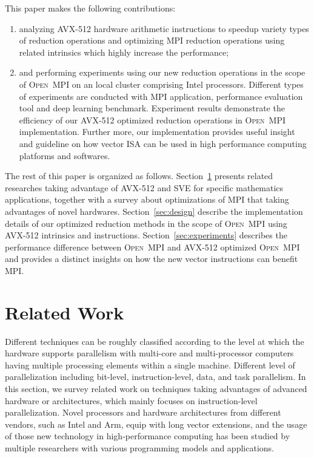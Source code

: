 \documentclass[sigconf,review]{acmart}
\newcommand{\ompi}[0]{\textsc{Open~MPI}\xspace}
\newcommand{\mpi}[0]{\textsc{MPI}\xspace}
\newcommand{\sve}[0]{\textsc{SVE}\xspace}
\begin{document}
This paper makes the following contributions:
\begin{enumerate}
  \item analyzing AVX-512 hardware arithmetic instructions to speedup variety types of reduction operations and optimizing \mpi  reduction operations using related intrinsics which highly increase the performance;
  \item and performing experiments using our
      new reduction operations in the scope of \ompi on an local cluster comprising Intel processors.
      Different types of experiments are conducted with \mpi application, performance evaluation tool and
      deep learning benchmark.
      Experiment results demonstrate the efficiency
      of our AVX-512 optimized reduction operations in \ompi implementation.
      Further more, our implementation provides useful insight and guideline on how vector
      ISA can be used in high performance computing platforms and softwares.
\end{enumerate}

The rest of this paper is organized as follows.
Section~\ref{sec:related} presents related researches taking advantage of AVX-512 and \sve for specific mathematics applications, together with a survey about optimizations of \mpi that taking advantages of novel hardwares.
Section~\ref{sec:design} describe the implementation details of our optimized reduction methods in the scope of \ompi using AVX-512 intrinsics and instructions.
Section~\ref{sec:experiments} describes the performance difference between \ompi and AVX-512 optimized \ompi and provides a distinct insights on how the new vector instructions can benefit \mpi.

\section{Related Work}\label{sec:related}
Different techniques can be roughly classified according to the level at which
the hardware supports parallelism with multi-core and multi-processor computers having
multiple processing elements within a single machine. Different level of parallelization including bit-level,
instruction-level, data, and task parallelism.
%
In this section, we survey related work on techniques taking advantages of
advanced hardware or architectures, which mainly focuses on instruction-level parallelization.
Novel processors and hardware architectures from different vendors, such as Intel and Arm,
equip with long vector extensions, and the usage of those new technology in high-performance computing has been
studied by multiple researchers with various programming models and applications.
%
\end{document}
